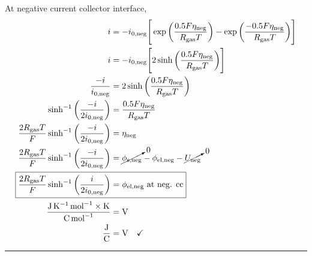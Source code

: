 \documentclass{article}
\begin{document}
At negative current collector interface,
\begin{align}
    i                                                                            & = -i_\text{0,neg}\Bigg[\exp\bigg(\frac{0.5 F \eta_\text{neg}}{R_\text{gas} T}\bigg) - \exp\bigg(\frac{-0.5 F \eta_\text{neg}}{R_\text{gas} T}\bigg)\Bigg] \\
    i                                                                            & = -i_\text{0,neg}\Bigg[2 \sinh\bigg(\frac{0.5 F \eta_\text{neg}}{R_\text{gas} T}\bigg) \Bigg]                                                             \\
    \frac{-i}{i_\text{0,neg}}                                                    & = 2 \sinh\bigg(\frac{0.5 F \eta_\text{neg}}{R_\text{gas} T}\bigg)                                                                                         \\
    \sinh^{-1}\bigg(\frac{-i}{2 i_\text{0,neg}}\bigg)                            & = \frac{0.5 F \eta_\text{neg}}{R_\text{gas} T}                                                                                                            \\
    \frac{2 R_\text{gas} T}{F} \sinh^{-1}\bigg(\frac{-i}{2 i_\text{0,neg}}\bigg) & = \eta_\text{neg}                                                                                                                                         \\
    \frac{2 R_\text{gas} T}{F} \sinh^{-1}\bigg(\frac{-i}{2 i_\text{0,neg}}\bigg) & = \cancelto{0}{\phi_\text{s,neg}} - \phi_\text{el,neg} - \cancelto{0}{U_\text{neg}}                                                                       \\
    \Aboxed{\frac{2 R_\text{gas} T}{F} \sinh^{-1}\bigg(\frac{i}{2 i_\text{0,neg}}\bigg)  & = \phi_\text{el,neg} \text{ at neg. cc}} \\
    \frac{\si{\joule \per \kelvin \per \mole} \times \si{\kelvin}}{\si{\coulomb\per\mole}} & = \si{\volt} \\
    \frac{\si{\joule}  }{\si{\coulomb}}& = \si{\volt} \quad \checkmark \label{eq:phielnegcc_dimcheck}
\end{align}

\medskip
\hrule
\end{document}

